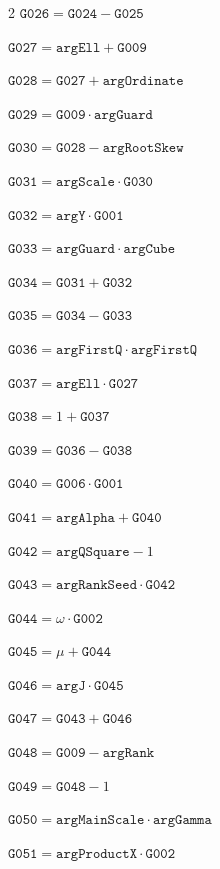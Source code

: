 \documentclass[10pt]{article}
\begin{document}
\begin{multicols}{2}
\noindent $\mathtt{G026}=\mathtt{G024}-\mathtt{G025}$\par
\noindent $\mathtt{G027}=\mathtt{argEll}+\mathtt{G009}$\par
\noindent $\mathtt{G028}=\mathtt{G027}+\mathtt{argOrdinate}$\par
\noindent $\mathtt{G029}=\mathtt{G009}\cdot \mathtt{argGuard}$\par
\noindent $\mathtt{G030}=\mathtt{G028}-\mathtt{argRootSkew}$\par
\noindent $\mathtt{G031}=\mathtt{argScale}\cdot \mathtt{G030}$\par
\noindent $\mathtt{G032}=\mathtt{argY}\cdot \mathtt{G001}$\par
\noindent $\mathtt{G033}=\mathtt{argGuard}\cdot \mathtt{argCube}$\par
\noindent $\mathtt{G034}=\mathtt{G031}+\mathtt{G032}$\par
\noindent $\mathtt{G035}=\mathtt{G034}-\mathtt{G033}$\par
\noindent $\mathtt{G036}=\mathtt{argFirstQ}\cdot \mathtt{argFirstQ}$\par
\noindent $\mathtt{G037}=\mathtt{argEll}\cdot \mathtt{G027}$\par
\noindent $\mathtt{G038}=1+\mathtt{G037}$\par
\noindent $\mathtt{G039}=\mathtt{G036}-\mathtt{G038}$\par
\noindent $\mathtt{G040}=\mathtt{G006}\cdot \mathtt{G001}$\par
\noindent $\mathtt{G041}=\mathtt{argAlpha}+\mathtt{G040}$\par
\noindent $\mathtt{G042}=\mathtt{argQSquare}-1$\par
\noindent $\mathtt{G043}=\mathtt{argRankSeed}\cdot \mathtt{G042}$\par
\noindent $\mathtt{G044}=\omega\cdot \mathtt{G002}$\par
\noindent $\mathtt{G045}=\mu+\mathtt{G044}$\par
\noindent $\mathtt{G046}=\mathtt{argJ}\cdot \mathtt{G045}$\par
\noindent $\mathtt{G047}=\mathtt{G043}+\mathtt{G046}$\par
\noindent $\mathtt{G048}=\mathtt{G009}-\mathtt{argRank}$\par
\noindent $\mathtt{G049}=\mathtt{G048}-1$\par
\noindent $\mathtt{G050}=\mathtt{argMainScale}\cdot \mathtt{argGamma}$\par
\noindent $\mathtt{G051}=\mathtt{argProductX}\cdot \mathtt{G002}$\par

\end{multicols}
\end{document}
